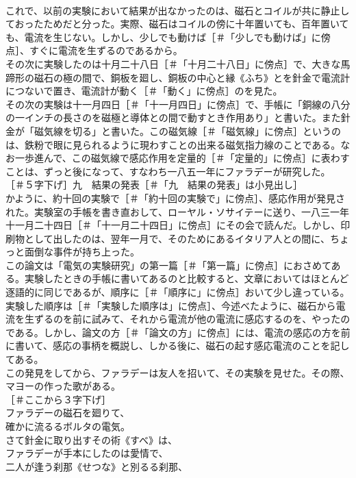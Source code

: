 \documentclass[8pt]{extreport}
\begin{document}
\begin{CJK}{UTF8}{min}
\\	これで、以前の実験において結果が出なかったのは、磁石とコイルが共に静止しておったためだと分った。実際、磁石はコイルの傍に十年置いても、百年置いても、電流を生じない。しかし、少しでも動けば［＃「少しでも動けば」に傍点］、すぐに電流を生ずるのであるから。
\\	その次に実験したのは十月二十八日［＃「十月二十八日」に傍点］で、大きな馬蹄形の磁石の極の間で、銅板を廻し、銅板の中心と縁《ふち》とを針金で電流計につないで置き、電流計が動く［＃「動く」に傍点］のを見た。
\\	その次の実験は十一月四日［＃「十一月四日」に傍点］で、手帳に「銅線の八分の一インチの長さのを磁極と導体との間で動すとき作用あり」と書いた。また針金が「磁気線を切る」と書いた。この磁気線［＃「磁気線」に傍点］というのは、鉄粉で眼に見られるように現わすことの出来る磁気指力線のことである。なお一歩進んで、この磁気線で感応作用を定量的［＃「定量的」に傍点］に表わすことは、ずっと後になって、すなわち一八五一年にファラデーが研究した。
\\	［＃５字下げ］九　結果の発表［＃「九　結果の発表」は小見出し］
\\	かように、約十回の実験で［＃「約十回の実験で」に傍点］、感応作用が発見された。実験室の手帳を書き直おして、ローヤル・ソサイテーに送り、一八三一年十一月二十四日［＃「十一月二十四日」に傍点］にその会で読んだ。しかし、印刷物として出したのは、翌年一月で、そのためにあるイタリア人との間に、ちょっと面倒な事件が持ち上った。
\\	この論文は「電気の実験研究」の第一篇［＃「第一篇」に傍点］におさめてある。実験したときの手帳に書いてあるのと比較すると、文章においてはほとんど逐語的に同じであるが、順序に［＃「順序に」に傍点］おいて少し違っている。実験した順序は［＃「実験した順序は」に傍点］、今述べたように、磁石から電流を生ずるのを前に試みて、それから電流が他の電流に感応するのを、やったのである。しかし、論文の方［＃「論文の方」に傍点］には、電流の感応の方を前に書いて、感応の事柄を概説し、しかる後に、磁石の起す感応電流のことを記してある。
\\	この発見をしてから、ファラデーは友人を招いて、その実験を見せた。その際、マヨーの作った歌がある。
\\	［＃ここから３字下げ］
\\	ファラデーの磁石を廻りて、
\\	確かに流るるボルタの電気。
\\	さて針金に取り出すその術《すべ》は、
\\	ファラデーが手本にしたのは愛情で、
\\	二人が逢う刹那《せつな》と別るる刹那、

\end{CJK}
\end{document}
